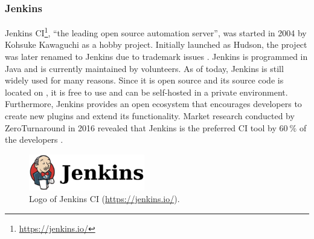 
\subsubsection{Jenkins}
Jenkins CI\footnote{\url{https://jenkins.io/}}, ``the leading open source automation server'', was started in 2004 by Kohsuke Kawaguchi as a hobby project. Initially launched as Hudson, the project was later renamed to Jenkins due to trademark issues \cite{SmartJenkinsDefinitive}. Jenkins is programmed in Java and is currently maintained by volunteers. As of today, Jenkins is still widely used for many reasons. Since it is open source and its source code is located on \github{}, it is free to use and can be self-hosted in a private environment. Furthermore, Jenkins provides an open ecosystem that encourages developers to create new plugins and extend its functionality. Market research conducted by ZeroTurnaround in 2016 revealed that Jenkins is the preferred CI tool by $\SI{60}{\percent}$ of the developers \cite{maple_2016}.

\begin{figure}[htbp!]
	\centering
	\includegraphics[width=0.45\textwidth]{assets/images/jenkins.pdf}
	\caption{Logo of Jenkins CI (\url{https://jenkins.io/}).}
	\label{fig:jenkins}
\end{figure}